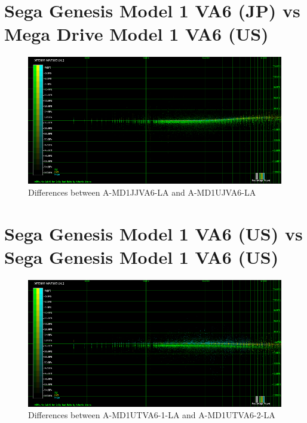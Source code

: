 \documentclass[10pt,a4paper]{report}
\begin{document}
\section{Sega Genesis Model 1 VA6 (JP) vs\\ Mega Drive Model 1 VA6 (US)}

\begin{figure}[H]
	\centering
	\includegraphics[width=1.0\linewidth]{images/results/3-A-MD1JJVA6_LA_vs_A-MD1UJVA6-LA.png}
	\caption[A-MD1JJVA6-LA vs A-MD1UJVA6-LA]{Differences between A-MD1JJVA6-LA and A-MD1UJVA6-LA}
	\label{fig:A-MD1JJVA6_LA_vs_A-MD1UJVA6-LA}
\end{figure}

\section{Sega Genesis Model 1 VA6 (US) vs\\ Sega Genesis Model 1 VA6 (US)}

\begin{figure}[H]
	\centering
	\includegraphics[width=1.0\linewidth]{images/results/4-A-MD1UTVA6-1_LA_vs_A-MD1UTVA6-2_LA.png}
	\caption[A-MD1UTVA6-1-LA vs A-MD1UTVA6-2-LA]{Differences between A-MD1UTVA6-1-LA and A-MD1UTVA6-2-LA}
	\label{fig:A-MD1UTVA6-1_LA_vs_A-MD1UTVA6-2_LA}
\end{figure}
\end{document}
